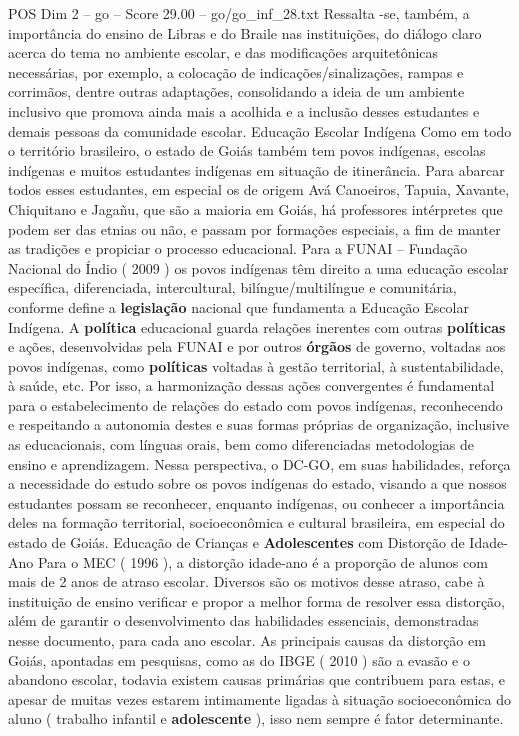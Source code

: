 \begin{textsample}{POS Dim 2 – go – Score 29.00 – go/go\_inf\_28.txt}
Ressalta -se, também, a importância do ensino de Libras e do Braile nas instituições, do diálogo claro acerca do tema no ambiente escolar, e das modificações arquitetônicas necessárias, por exemplo, a colocação de indicações/sinalizações, rampas e corrimãos, dentre outras adaptações, consolidando a ideia de um ambiente inclusivo que promova ainda mais a acolhida e a inclusão desses estudantes e demais pessoas da comunidade escolar.
Educação Escolar Indígena Como em todo o território brasileiro, o estado de Goiás também tem povos indígenas, escolas indígenas e muitos estudantes indígenas em situação de itinerância.
Para abarcar todos esses estudantes, em especial os de origem Avá Canoeiros, Tapuia, Xavante, Chiquitano e Jagañu, que são a maioria em Goiás, há professores intérpretes que podem ser das etnias ou não, e passam por formações especiais, a fim de manter as tradições e propiciar o processo educacional.
Para a FUNAI – Fundação Nacional do Índio ( 2009 ) os povos indígenas têm direito a uma educação escolar específica, diferenciada, intercultural, bilíngue/multilíngue e comunitária, conforme define a \textbf{legislação} nacional que fundamenta a Educação Escolar Indígena.
A \textbf{política} educacional guarda relações inerentes com outras \textbf{políticas} e ações, desenvolvidas pela FUNAI e por outros \textbf{órgãos} de governo, voltadas aos povos indígenas, como \textbf{políticas} voltadas à gestão territorial, à sustentabilidade, à saúde, etc.
Por isso, a harmonização dessas ações convergentes é fundamental para o estabelecimento de relações do estado com povos indígenas, reconhecendo e respeitando a autonomia destes e suas formas próprias de organização, inclusive as educacionais, com línguas orais, bem como diferenciadas metodologias de ensino e aprendizagem.
Nessa perspectiva, o DC-GO, em suas habilidades, reforça a necessidade do estudo sobre os povos indígenas do estado, visando a que nossos estudantes possam se reconhecer, enquanto indígenas, ou conhecer a importância deles na formação territorial, socioeconômica e cultural brasileira, em especial do estado de Goiás.
Educação de Crianças e \textbf{Adolescentes} com Distorção de Idade-Ano Para o MEC ( 1996 ), a distorção idade-ano é a proporção de alunos com mais de 2 anos de atraso escolar.
Diversos são os motivos desse atraso, cabe à instituição de ensino verificar e propor a melhor forma de resolver essa distorção, além de garantir o desenvolvimento das habilidades essenciais, demonstradas nesse documento, para cada ano escolar.
As principais causas da distorção em Goiás, apontadas em pesquisas, como as do IBGE ( 2010 ) são a evasão e o abandono escolar, todavia existem causas primárias que contribuem para estas, e apesar de muitas vezes estarem intimamente ligadas à situação socioeconômica do aluno ( trabalho infantil e \textbf{adolescente} ), isso nem sempre é fator determinante.

\end{textsample}
